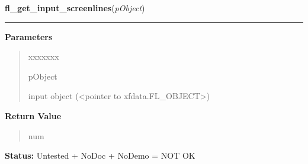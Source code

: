 \hspace{.8\funcindent}\begin{boxedminipage}{\funcwidth}

    \raggedright \textbf{fl\_get\_input\_screenlines}(\textit{pObject})

    \vspace{-1.5ex}

    \rule{\textwidth}{0.5\fboxrule}
\setlength{\parskip}{2ex}
\setlength{\parskip}{1ex}
      \textbf{Parameters}
      \vspace{-1ex}

      \begin{quote}
        \begin{Ventry}{xxxxxxx}

          \item[pObject]

          input object ({\textless}pointer to 
          xfdata.FL\_OBJECT{\textgreater})

        \end{Ventry}

      \end{quote}

      \textbf{Return Value}
    \vspace{-1ex}

      \begin{quote}
      num

      \end{quote}

\textbf{Status:} Untested + NoDoc + NoDemo = NOT OK



    \end{boxedminipage}

    \label{xformslib:library:fl_get_input_cursorpos}

    \vspace{0.5ex}

